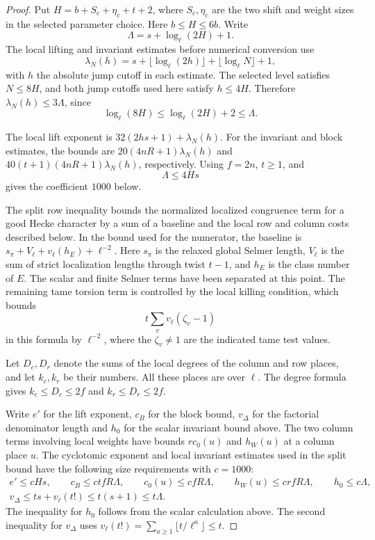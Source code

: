 \begin{proof}
Put \(H=b+S_c+\eta_c+t+2\), where \(S_c,\eta_c\) are the
two shift and weight sizes in the selected parameter choice.
Here \(b\le H\le6b\). Write
\[
                    \Lambda=s+\log_\ell(2H)+1 .
\]
The local lifting and invariant estimates before numerical
conversion use
\[
 \lambda_N(h)=s+\lfloor\log_\ell(2h)\rfloor+ \lfloor\log_\ell N\rfloor+1,
\]
with \(h\) the absolute
jump cutoff in each estimate. The selected level satisfies
\(N\le8H\), and both jump cutoffs used here satisfy \(h\le4H\).
Therefore \(\lambda_N(h)\le3\Lambda\), since
\[
 \log_\ell(8H)\le\log_\ell(2H)+2\le\Lambda.
\]

The local lift exponent is \(32(2hs+1)+\lambda_N(h)\).
For the invariant and block estimates, the bounds are
\(20(4nR+1)\lambda_N(h)\) and
\(40(t+1)(4nR+1)\lambda_N(h)\), respectively.
Using \(f=2n\), \(t\ge1\), and
\[
 \Lambda\le4Hs
\]
gives the coefficient \(1000\) below.

The split row inequality bounds the normalized localized
congruence term for a good Hecke character by a sum of a
baseline and the local row and column costs described below.
In the bound used for the numerator, the baseline is
\(s_\pi+V_\ell+v_\ell(h_E)+\ell^{-2}\).
Here \(s_\pi\) is the relaxed global Selmer length,
\(V_\ell\) is the sum of strict localization lengths through
twist \(t-1\), and \(h_E\) is the class number of \(E\).
The scalar and finite Selmer terms have been separated at this point. The remaining tame torsion term is controlled by the local killing condition, which bounds
\[
 t\sum_v v_\ell(\zeta_v-1)
\]
in this formula by \(\ell^{-2}\),
where the \(\zeta_v\ne1\) are the indicated tame test values.

Let \(D_c,D_r\) denote the sums of the local degrees of the
column and row places, and let \(k_c,k_r\) be their numbers.
All these places are over \(\ell\). The degree formula
gives \(k_c\le D_c\le2f\) and \(k_r\le D_r\le2f\).

Write \(e'\) for the lift exponent, \(c_B\) for the block
bound, \(v_\Delta\) for the factorial denominator length
and \(h_0\) for the scalar invariant bound above. The two
column terms involving local weights have bounds
\(r c_0(u)\) and \(h_W(u)\) at a column place \(u\).
The cyclotomic exponent and local invariant estimates used
in the split bound have the following size requirements
with \(c=1000\):
\[
 \begin{gathered}
  e'\le cHs,\qquad c_B\le ctfR\Lambda,\qquad
  c_0(u)\le cfR\Lambda,\qquad h_W(u)\le crfR\Lambda,\qquad
  h_0\le c\Lambda,\\
  v_\Delta\le ts+v_\ell(t!)\le t(s+1)\le t\Lambda .
 \end{gathered}
\]
The inequality for \(h_0\) follows from the scalar
calculation above. The second inequality for \(v_\Delta\)
uses \(v_\ell(t!)=\sum_{a\ge1}\lfloor t/\ell^a\rfloor\le t\).


\end{proof}
